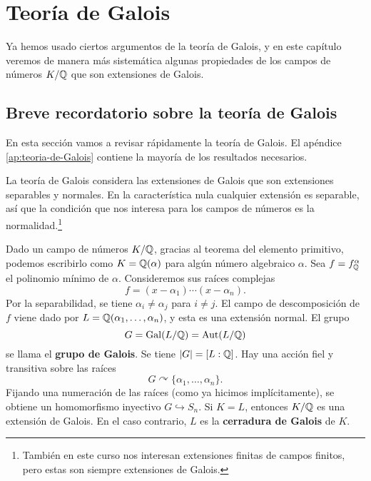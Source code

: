 \chapter{Teoría de Galois}

Ya hemos usado ciertos argumentos de la teoría de Galois, y en este capítulo
veremos de manera más sistemática algunas propiedades de los campos de números
$K/\mathbb{Q}$ que son extensiones de Galois.


\section{Breve recordatorio sobre la teoría de Galois}

En esta sección vamos a revisar rápidamente la teoría de Galois. El apéndice
\ref{ap:teoria-de-Galois} contiene la mayoría de los resultados necesarios.

\vspace{1em}

La teoría de Galois considera las extensiones de Galois que son extensiones
separables y normales. En la característica nula cualquier extensión es
separable, así que la condición que nos interesa para los campos de números es
la normalidad.\footnote{También en este curso nos interesan extensiones finitas
  de campos finitos, pero estas son siempre extensiones de Galois.}

Dado un campo de números $K/\mathbb{Q}$, gracias al teorema del elemento primitivo,
podemos escribirlo como $K = \mathbb{Q} (\alpha)$ para algún número algebraico
$\alpha$. Sea $f = f^\alpha_{\mathbb{Q}}$ el polinomio mínimo de $\alpha$. Consideremos
sus raíces complejas
$$f = (x - \alpha_1) \cdots (x - \alpha_n).$$
Por la separabilidad, se tiene $\alpha_i \ne \alpha_j$ para $i \ne j$.
El campo de descomposición de $f$ viene dado por
$L = \mathbb{Q} (\alpha_1, \ldots, \alpha_n)$, y esta es una extensión normal.
El grupo
$$G = \operatorname{Gal} (L/\mathbb{Q}) = \operatorname{Aut} (L/\mathbb{Q})$$
se llama el \textbf{grupo de Galois}. Se tiene $|G| = [L : \mathbb{Q}]$.
Hay una acción fiel y transitiva sobre las raíces
$$G \curvearrowright \{ \alpha_1, \ldots, \alpha_n \}.$$
Fijando una numeración de las raíces (como ya hicimos implícitamente),
se obtiene un homomorfismo inyectivo $G \hookrightarrow S_n$. Si $K = L$,
entonces $K/\mathbb{Q}$ es una extensión de Galois. En el caso contrario, $L$ es la
\textbf{cerradura de Galois} de $K$.

